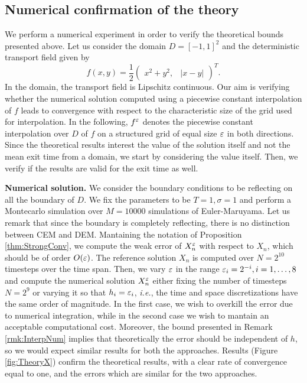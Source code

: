 \subsection{Numerical confirmation of the theory}

We perform a numerical experiment in order to verify the theoretical bounds presented above. Let us consider the domain $D = [-1, 1]^2$ and the deterministic transport field given by
\begin{equation*}
	f(x, y) = \frac{1}{2} \begin{pmatrix} x^2 + y^2, & |x - y| \end{pmatrix}^T.
\end{equation*}
In the domain, the transport field is Lipschitz continuous. Our aim is verifying whether the numerical solution computed using a piecewise constant interpolation of $f$ leads to convergence with respect to the characteristic size of the grid used for interpolation. In the following, $f^\varepsilon$ denotes the piecewise constant interpolation over $D$ of $f$ on a structured grid of equal size $\varepsilon$ in both directions. Since the theoretical results interest the value of the solution itself and not the mean exit time from a domain, we start by considering the value itself. Then, we verify if the results are valid for the exit time as well.

\vspace{2mm}
\noindent \textbf{Numerical solution.} We consider the boundary conditions to be reflecting on all the boundary of $D$. We fix the parameters to be $T = 1, \sigma = 1$ and perform a Montecarlo simulation over $M = 10000$ simulations of Euler-Maruyama. Let us remark that since the boundary is completely reflecting, there is no distinction between CEM and DEM. Mantaining the notation of Proposition \ref{thm:StrongConv}, we compute the weak error of $X_n^\varepsilon$ with respect to $X_n$, which should be of order $O(\varepsilon)$. The reference solution $X_n$ is computed over $N = 2^{10}$ timesteps over the time span. Then, we vary $\varepsilon$ in the range $\varepsilon_i = 2^{-i}, i = 1,\dots, 8$ and compute the numerical solution $X_n^\varepsilon$ either fixing the number of timesteps $N = 2^9$ or varying it so that $h_i = \varepsilon_i$, \textit{i.e.}, the time and space discretizations have the same order of magnitude. In the first case, we wish to overkill the error due to numerical integration, while in the second case we wish to mantain an acceptable computational cost. Moreover, the bound presented in Remark \ref{rmk:InterpNum} implies that theoretically the error should be independent of $h$, so we would expect similar results for both the approaches. Results (Figure \ref{fig:TheoryX}) confirm the theoretical results, with a clear rate of convergence equal to one, and the errors which are similar for the two approaches.

